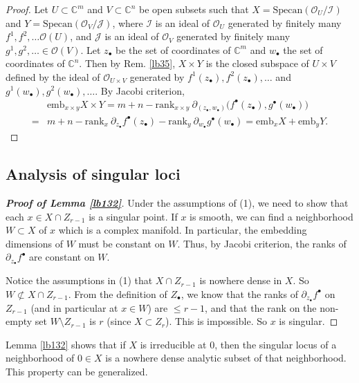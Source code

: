 \documentclass[12pt,b5paper,notitlepage]{report}
\theoremstyle{definition}
\theoremstyle{plain}
\newcommand{\mc}{\mathcal}
\newcommand{\scr}{\mathscr}
\newcommand{\blt}{\bullet}
\newcommand{\Cbb}{\mathbb C}
\newcommand{\Specan}{\mathrm{Specan}}
\newcommand{\rank}{\mathrm{rank}}
\newcommand{\emb}{\mathrm{emb}}
\numberwithin{equation}{section}
\begin{document}
\begin{proof}
Let $U\subset\Cbb^m$ and $V\subset\Cbb^n$ be open subsets such that $X=\Specan(\scr O_U/\mc I)$ and $Y=\Specan(\scr O_V/\mc J)$, where $\mc I$ is an ideal of $\scr O_U$  generated by finitely many $f^1,f^2,\dots\scr O(U)$, and $\mc J$ is an ideal of $\scr O_V$ generated by finitely many $g^1,g^2,\dots\in\scr O(V)$. Let $z_\blt$ be the set of coordinates of $\Cbb^m$ and $w_\blt$ the set of coordinates of $\Cbb^n$. Then by Rem. \ref{lb35}, $X\times Y$ is the closed subspace of $U\times V$ defined by the ideal of $\scr O_{U\times V}$ generated by $f^1(z_\blt),f^2(z_\blt),\dots$ and $g^1(w_\blt),g^2(w_\blt),\dots$. By Jacobi criterion,
\begin{align*}
&\emb_{x\times y}X\times Y=m+n-\rank_{x\times y}~\partial_{(z_\blt,w_\blt)}\big(f^\blt(z_\blt),g^\blt(w_\blt)\big)\\
=&m+n-\rank_x~\partial_{z_\blt}f^\blt(z_\blt)-\rank_y~\partial_{w_\blt}g^\blt(w_\blt)=\emb_xX+\emb_yY.
\end{align*}
\end{proof}







\subsection{Analysis of singular loci}\label{lb384}



\begin{proof}[\textbf{Proof of Lemma \ref{lb132}}]
Under the assumptions of (1), we need to show that each $x\in X\cap Z_{r-1}$ is a singular point. If $x$ is smooth, we can find a neighborhood $W\subset X$ of $x$ which is a complex manifold. In particular, the embedding dimensions of $W$ must be constant on $W$. Thus, by Jacobi criterion, the ranks of $\partial_{z_\blt}f^\blt$ are constant on $W$.

Notice the assumptions in (1) that $X\cap Z_{r-1}$ is nowhere dense in $X$. So $W\nsubset X\cap Z_{r-1}$. From the definition of $Z_\blt$, we know that the ranks of $\partial_{z_\blt}f^\blt$ on $Z_{r-1}$ (and in particular at $x\in W$) are $\leq r-1$, and that the rank on the non-empty set $W\setminus Z_{r-1}$ is $r$ (since $X\subset Z_r$). This is impossible. So $x$ is singular.
\end{proof}



Lemma \ref{lb132} shows that if $X$ is irreducible at $0$, then the singular locus of a neighborhood of $0\in X$ is a nowhere dense analytic subset of that neighborhood. This property can be generalized.
\end{document}
